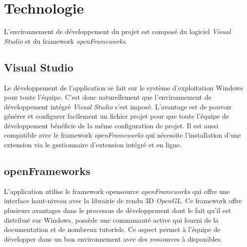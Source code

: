 \section{Technologie}
\label{s:technologie}
L'environnement de développement du projet est composé du logiciel \textit{Visual Studio} et du framework \textit{openFrameworks}.
\subsection{Visual Studio}
Le développement de l'application se fait sur le système d'exploitation Windows pour toute l'équipe. C'est donc naturellement que l'environnement de développement intégré \textit{Visual Studio} s'est imposé. L'avantage est de pouvoir générer et configurer facilement un fichier projet pour que toute l'équipe de développement bénéficie de la même configuration de projet. Il est aussi compatible avec le framework \textit{openFrameworks} qui nécessite l'installation d'une extension via le gestionnaire d'extension intégré et en ligne.
\subsection{openFrameworks}
L'application utilise le framework opensource \textit{openFrameworks} qui offre une interface haut-niveau avec la librairie de rendu 3D \textit{OpenGL}. Ce framework offre plusieurs avantages dans le processus de développement dont le fait qu'il est distribué sur Windows, possède une communauté active qui fourni de la documentation et de nombreux tutoriels. Ce aspect permet à l'équipe de développer dans un bon environnement avec des ressources à disponibles.